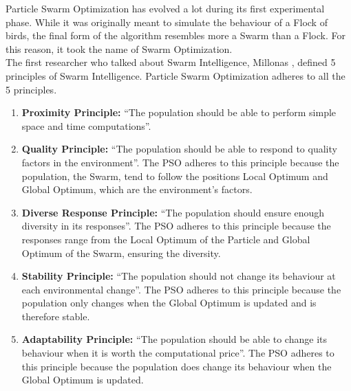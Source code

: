 Particle Swarm Optimization has evolved a lot during its first experimental phase.
While it was originally meant to simulate the behaviour of a Flock of birds, the final form of the algorithm resembles more a Swarm than a Flock. For this reason, it took the name of Swarm Optimization.
\\[0.3cm]The first researcher who talked about Swarm Intelligence, Millonas \cite{SwarmIntelligence}, defined 5 principles of Swarm Intelligence.
Particle Swarm Optimization adheres to all the 5 principles.
\begin{enumerate}[itemsep=0.1cm]
    \item \textbf{Proximity Principle:} “The population should be able to perform simple space and time computations”.
	\item \textbf{Quality Principle:} “The population should be able to respond to quality factors in the environment”.
	The PSO adheres to this principle because the population, the Swarm, tend to follow the positions Local Optimum and Global Optimum, which are the environment's factors.
	\item \textbf{Diverse Response Principle:} “The population should ensure enough diversity in its responses”.
	The PSO adheres to this principle because the responses range from the Local Optimum of the Particle and Global Optimum of the Swarm, ensuring the diversity.
	\item \textbf{Stability Principle:} “The population should not change its behaviour at each environmental change”.
	The PSO adheres to this principle because the population only changes when the Global Optimum is updated and is therefore stable.
	\item \textbf{Adaptability Principle:} “The population should be able to change its behaviour when it is worth the computational price”.
	The PSO adheres to this principle because the population does change its behaviour when the Global Optimum is updated.
\end{enumerate}
% 
% 
% 
